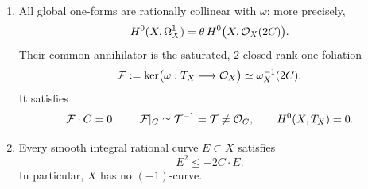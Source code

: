 \begin{theorem}
\begin{enumerate}
      \begin{equation}\label{eq:smallest-endpoint-global-cotangent}
       0\longrightarrow\OO_X(2C)
       \xrightarrow{\ \theta\ }\Omega_X^1
       \longrightarrow I_{Z_0}\otimes\omega_X(-2C)
       \longrightarrow0,
      \end{equation}
      and
      \begin{equation}\label{eq:smallest-endpoint-global-chern}
       \operatorname{length}(Z_0)=c_2(X)\ge0.
      \end{equation}
\item All global one-forms are rationally collinear with $\omega$;
      more precisely,
      \begin{equation}\label{eq:smallest-endpoint-global-forms}
       H^0(X,\Omega_X^1)
       =\theta\,H^0\bigl(X,\mathcal O_X(2C)\bigr).
      \end{equation}
      Their common annihilator is the saturated, $2$-closed
      rank-one foliation
      \begin{equation}\label{eq:smallest-endpoint-global-foliation}
       \mathcal F
       :=\ker\bigl(\omega:T_X\longrightarrow\mathcal O_X\bigr)
       \simeq\omega_X^{-1}(2C).
      \end{equation}
      It satisfies
      \[
       \mathcal F\cdot C=0,\qquad
       \mathcal F|_C\simeq\mathcal T^{-1}
       =\mathcal T\ne\mathcal O_C,\qquad H^0(X,T_X)=0.
      \]
\item Every smooth integral rational curve $E\subset X$ satisfies
      \begin{equation}\label{eq:smallest-endpoint-global-rational-curve}
       E^2\le-2C\cdot E.
      \end{equation}
      In particular, $X$ has no $(-1)$-curve.
\end{enumerate}
\end{theorem}

